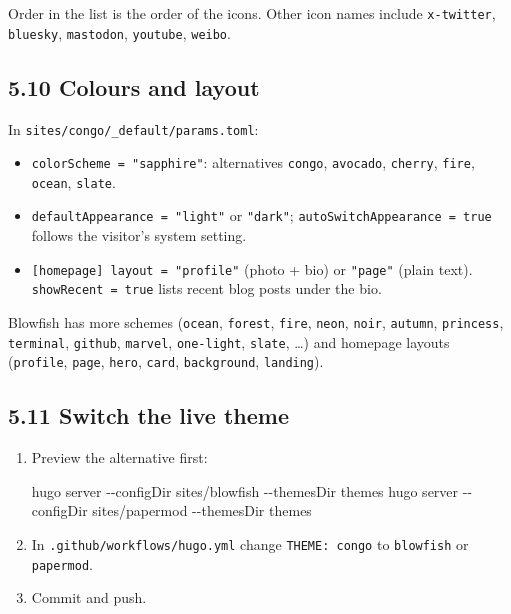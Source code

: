 \documentclass[
  10pt,
]{article}
\newenvironment{Shaded}{\begin{snugshade}}{\end{snugshade}}
\newcommand{\AttributeTok}[1]{\textcolor[rgb]{0.13,0.29,0.53}{#1}}
\newcommand{\ExtensionTok}[1]{#1}
\newcommand{\NormalTok}[1]{#1}
\providecommand{\tightlist}{%
  \setlength{\itemsep}{0pt}\setlength{\parskip}{0pt}}
\begin{document}
Order in the list is the order of the icons. Other icon names include
\texttt{x-twitter}, \texttt{bluesky}, \texttt{mastodon},
\texttt{youtube}, \texttt{weibo}.

\hypertarget{colours-and-layout}{%
\subsection{5.10 Colours and layout}\label{colours-and-layout}}

In \texttt{sites/congo/\_default/params.toml}:

\begin{itemize}
\tightlist
\item
  \texttt{colorScheme\ =\ "sapphire"}: alternatives \texttt{congo},
  \texttt{avocado}, \texttt{cherry}, \texttt{fire}, \texttt{ocean},
  \texttt{slate}.
\item
  \texttt{defaultAppearance\ =\ "light"} or \texttt{"dark"};
  \texttt{autoSwitchAppearance\ =\ true} follows the visitor's system
  setting.
\item
  \texttt{{[}homepage{]}\ layout\ =\ "profile"} (photo + bio) or
  \texttt{"page"} (plain text). \texttt{showRecent\ =\ true} lists
  recent blog posts under the bio.
\end{itemize}

Blowfish has more schemes (\texttt{ocean}, \texttt{forest},
\texttt{fire}, \texttt{neon}, \texttt{noir}, \texttt{autumn},
\texttt{princess}, \texttt{terminal}, \texttt{github}, \texttt{marvel},
\texttt{one-light}, \texttt{slate}, \ldots) and homepage layouts
(\texttt{profile}, \texttt{page}, \texttt{hero}, \texttt{card},
\texttt{background}, \texttt{landing}).

\hypertarget{switch-the-live-theme}{%
\subsection{5.11 Switch the live theme}\label{switch-the-live-theme}}

\begin{enumerate}
\def\labelenumi{\arabic{enumi}.}
\item
  Preview the alternative first:

\begin{Shaded}
\begin{Highlighting}[]
\ExtensionTok{hugo}\NormalTok{ server }\AttributeTok{{-}{-}configDir}\NormalTok{ sites/blowfish }\AttributeTok{{-}{-}themesDir}\NormalTok{ themes}
\ExtensionTok{hugo}\NormalTok{ server }\AttributeTok{{-}{-}configDir}\NormalTok{ sites/papermod }\AttributeTok{{-}{-}themesDir}\NormalTok{ themes}
\end{Highlighting}
\end{Shaded}
\item
  In \texttt{.github/workflows/hugo.yml} change \texttt{THEME:\ congo}
  to \texttt{blowfish} or \texttt{papermod}.
\item
  Commit and push.
\end{enumerate}
\end{document}
